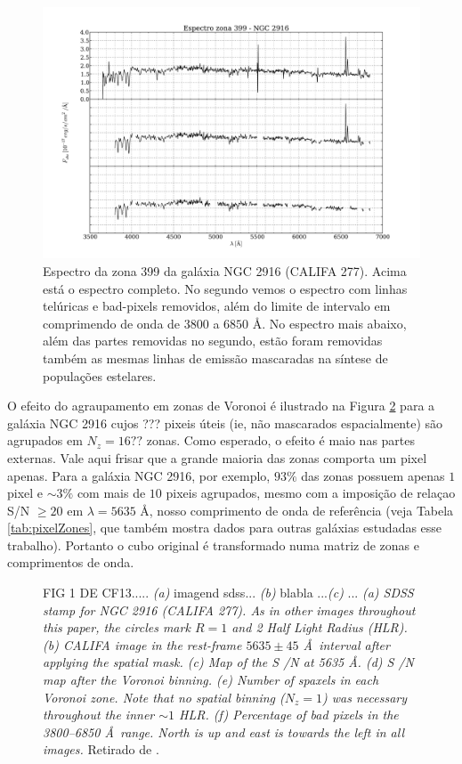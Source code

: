 \begin{figure}
    \includegraphics[width=1.0\textwidth]{figuras/K0277-constant_inital_mask-399.pdf}
    \caption[Exemplo de máscaras em um espectro do cubo de dados.]
    {Espectro da zona 399 da galáxia NGC 2916 (CALIFA 277). Acima está o espectro completo. No segundo vemos o espectro
    com linhas telúricas e bad-pixels removidos, além do limite de intervalo em comprimendo de onda de $3800$ a $6850$
    \AA. No espectro mais abaixo, além das partes removidas no segundo, estão foram removidas também as mesmas linhas de
    emissão mascaradas na síntese de populações estelares.}
    \label{fig:checkmask}
\end{figure}




O efeito do agraupamento em zonas de Voronoi é ilustrado na Figura \ref{fig:Fig1DeCF13} para a galáxia NGC 2916 cujos
??? pixeis úteis (ie, não mascarados espacialmente) são agrupados em $N_z = 16??$ zonas. Como esperado, o efeito é maio
nas partes externas. Vale aqui frisar que a grande maioria das zonas comporta um pixel apenas. Para a galáxia NGC 2916,
por exemplo, $93\%$ das zonas possuem apenas $1$ pixel e $\sim 3\%$ com mais de $10$ pixeis agrupados, mesmo com a
imposição de relaçao S/N $\ge 20$ em $\lambda = 5635$ \AA, nosso comprimento de onda de referência (veja Tabela
\ref{tab:pixelZones}, que também mostra dados para outras galáxias estudadas esse trabalho). Portanto o cubo original é
transformado numa matriz de zonas e comprimentos de onda.

\begin{figure}
    \caption[\ojo]
    {\ojo FIG 1 DE CF13..... {\em (a)} imagend sdss... {\em (b)} blabla ...{\em (c)} ...
{\em (a) SDSS stamp for NGC 2916 (CALIFA 277). As in other images throughout this paper, the circles mark $R = 1$ and 2 Half Light Radius (HLR). (b) CALIFA image in the rest-frame $5635 \pm 45$ \AA\ interval after applying the spatial mask. (c) Map of the S /N at 5635 \AA. (d) S /N map after the Voronoi binning. (e) Number of spaxels in each Voronoi zone. Note that no spatial binning ($N_z = 1$) was necessary throughout the inner $\sim 1$ HLR. (f) Percentage of bad pixels in the 3800--6850 \AA\ range. North is up and east is towards the left in all images.    }
    Retirado de \citet{!!!}.}
	\label{fig:Fig1DeCF13}
\end{figure}

